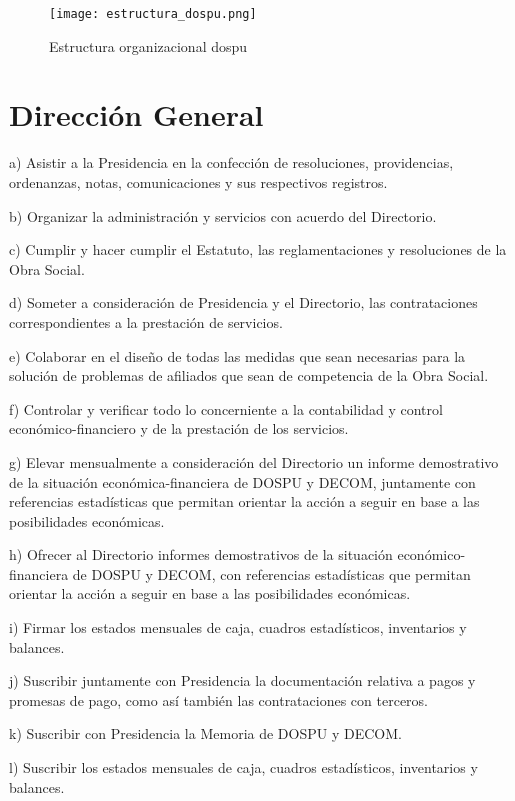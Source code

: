 \begin{figure}
    \centering
    \texttt{[image: estructura\_dospu.png]}
    \caption{Estructura organizacional \acrshort{dospu} \cite{CSOrd17}}
    \label{fig:estructura_dospu}
\end{figure}

\section{Dirección General}
\begin{displayquote}
a) Asistir a la Presidencia en la confección de resoluciones, providencias, ordenanzas, notas, comunicaciones y sus respectivos registros.

b) Organizar la administración y servicios con acuerdo del Directorio.

c) Cumplir y hacer cumplir el Estatuto, las reglamentaciones y resoluciones de la Obra Social.

d) Someter a consideración de Presidencia y el Directorio, las contrataciones correspondientes a la prestación de servicios.

e) Colaborar en el diseño de todas las medidas que sean necesarias para la solución de problemas de afiliados que sean de competencia de la Obra Social.

f) Controlar y verificar todo lo concerniente a la contabilidad y control económico-financiero y de la prestación de los servicios.

g) Elevar mensualmente a consideración del Directorio un informe demostrativo de la situación económica-financiera de DOSPU y DECOM, juntamente con referencias estadísticas que permitan orientar la acción a seguir en base a las posibilidades económicas.

h) Ofrecer al Directorio informes demostrativos de la situación económico-financiera de DOSPU y DECOM, con referencias estadísticas que permitan orientar la acción a seguir en base a las posibilidades económicas.

i) Firmar los estados mensuales de caja, cuadros estadísticos, inventarios y balances.

j) Suscribir juntamente con Presidencia la documentación relativa a pagos y promesas de pago, como así también las contrataciones con terceros.

k) Suscribir con Presidencia la Memoria de DOSPU y DECOM.

l) Suscribir los estados mensuales de caja, cuadros estadísticos, inventarios y balances.


\end{displayquote}
